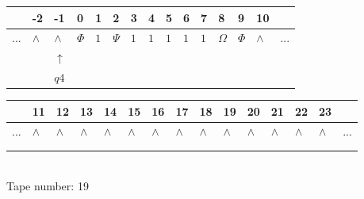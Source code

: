 \documentclass[11pt]{article}
\begin{document}
\begin{table}[H]
\centering
\begin{tabular}{lllllllllllllll}
 & -2 & -1 & 0 & 1 & 2 & 3 & 4 & 5 & 6 & 7 & 8 & 9 & 10 & \\
\hline
$...$ & \multicolumn{1}{|l|}{$\wedge$} & \multicolumn{1}{|l|}{$\wedge$} & \multicolumn{1}{|l|}{$\Phi$} & \multicolumn{1}{|l|}{$1$} & \multicolumn{1}{|l|}{$\Psi$} & \multicolumn{1}{|l|}{$1$} & \multicolumn{1}{|l|}{$1$} & \multicolumn{1}{|l|}{$1$} & \multicolumn{1}{|l|}{$1$} & \multicolumn{1}{|l|}{$1$} & \multicolumn{1}{|l|}{$\Omega$} & \multicolumn{1}{|l|}{$\Phi$} & \multicolumn{1}{|l|}{$\wedge$} & $...$\\
\hline
&  & $\uparrow$ &  &  &  &  &  &  &  &  &  &  &  &  \\
&  & $ q4 $ &  &  &  &  &  &  &  &  &  &  &  &  \\
\end{tabular}
\begin{tabular}{lllllllllllllll}
 & 11 & 12 & 13 & 14 & 15 & 16 & 17 & 18 & 19 & 20 & 21 & 22 & 23 & \\
\hline
$...$ & \multicolumn{1}{|l|}{$\wedge$} & \multicolumn{1}{|l|}{$\wedge$} & \multicolumn{1}{|l|}{$\wedge$} & \multicolumn{1}{|l|}{$\wedge$} & \multicolumn{1}{|l|}{$\wedge$} & \multicolumn{1}{|l|}{$\wedge$} & \multicolumn{1}{|l|}{$\wedge$} & \multicolumn{1}{|l|}{$\wedge$} & \multicolumn{1}{|l|}{$\wedge$} & \multicolumn{1}{|l|}{$\wedge$} & \multicolumn{1}{|l|}{$\wedge$} & \multicolumn{1}{|l|}{$\wedge$} & \multicolumn{1}{|l|}{$\wedge$} & $...$\\
\hline
&  &  &  &  &  &  &  &  &  &  &  &  &  &  \\
&  &  &  &  &  &  &  &  &  &  &  &  &  &  \\
\end{tabular}
\\
Tape number: 19
\noindent\makebox[\linewidth]{\hdashrule{\textwidth}{1pt}{1pt}}\end{table}
\clearpage
\end{document}
